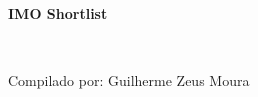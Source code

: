 \begin{center}
    {\fontsize{.8cm}{1cm}\selectfont
    
    \hrulefill\\\vspace{-1.25em}
    \hrulefill\\
    
    \textbf{IMO Shortlist} \\\vspace{-.75em}
    
    \hrulefill\\\vspace{-1.25em}
	\hrulefill

	\vspace{0.1cm}
	}

	{\hfill Compilado por: Guilherme Zeus Moura}

    \vspace{1cm}
    
    \fontsize{.5cm}{.65cm}\selectfont
    
%        
\end{center}
